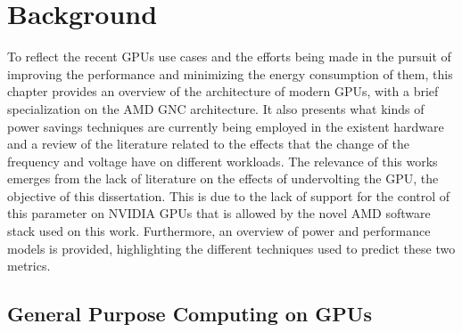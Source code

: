 
\chapter{Background}
\label{chapter:stateoftheart}


To reflect the recent GPUs use cases and the efforts being made in the pursuit of improving the performance and minimizing the energy consumption of them, this chapter provides an overview of the architecture of modern GPUs, with a brief specialization on the AMD GNC architecture. It also presents what kinds of power savings techniques are currently being employed in the existent hardware and a review of the literature related to the effects that the change of the frequency and voltage have on different workloads. The relevance of this works emerges from the lack of literature on the effects of undervolting the GPU, the objective of this dissertation. This is due to the lack of support for the control of this parameter on NVIDIA GPUs that is allowed by the novel AMD software stack used on this work. Furthermore, an overview of power and performance models is provided, highlighting the different techniques used to predict these two metrics. 


\section{General Purpose Computing on GPUs}
\label{section:gpuarch}

